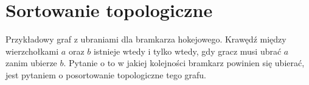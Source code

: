\section{Sortowanie topologiczne}

\label{sec:sortowanietopologiczne}

{
Przykładowy graf z ubraniami dla bramkarza hokejowego.
Krawędź między wierzchołkami $a$ oraz $b$ istnieje wtedy i tylko wtedy, gdy gracz musi ubrać $a$ zanim ubierze $b$.
Pytanie o to w jakiej kolejności bramkarz powinien się ubierać, jest pytaniem o posortowanie topologiczne tego grafu.
}
